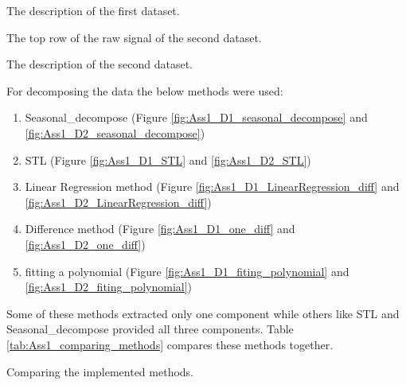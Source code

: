 \documentclass[12pt]{article}
\begin{document}
\begin{enumerate}
\begin{table}[H]
 \centering
\caption{The description of the first dataset.
{\label{tab:Ass1_D1_raw_signal_summary_statistics}}}

\end{table}

\begin{table}[H]
 \centering
\caption{The top row of the raw signal of the second dataset.
{\label{tab:Ass1_D2_raw_signal}}}

\end{table}

\begin{table}[H]
 \centering
\caption{The description of the second dataset.
{\label{tab:Ass1_D2_raw_signal_summary_statistics}}}

\end{table}

For decomposing the data the below methods were used:
    \begin{enumerate}
    \item Seasonal\_decompose (Figure
        \ref{fig:Ass1_D1_seasonal_decompose} and \ref{fig:Ass1_D2_seasonal_decompose})
        
    \item STL (Figure
        \ref{fig:Ass1_D1_STL} and \ref{fig:Ass1_D2_STL})
        
    \item Linear Regression method (Figure
        \ref{fig:Ass1_D1_LinearRegression_diff} and \ref{fig:Ass1_D2_LinearRegression_diff})
        
    \item Difference method (Figure
        \ref{fig:Ass1_D1_one_diff} and \ref{fig:Ass1_D2_one_diff})
        
    \item fitting a polynomial (Figure
        \ref{fig:Ass1_D1_fiting_polynomial} and \ref{fig:Ass1_D2_fiting_polynomial})

    \end{enumerate}
Some of these methods extracted only one component while others like STL and Seasonal\_decompose provided all three components. Table \ref{tab:Ass1_comparing_methods} compares these methods together.

\begin{table}[H]
\centering
\caption{Comparing the implemented methods.
\label{tab:Ass1_comparing_methods}}

\end{table}





\end{enumerate}
\end{document}
